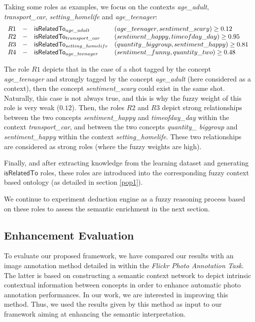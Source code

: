 		Taking some roles as examples, we focus on the contexts \emph{age\_adult}, \emph{transport\_car},
		\emph{setting\_homelife} and \emph{age\_teenager}:
		\begin{equation*}
			\begin{array}{ c c l l}
			R1 & - &\mathsf{isRelatedTo}_{age\_adult} 
				& (age\_teenager,sentiment\_scary) \geq 0.12\\
			R2 & - &\mathsf{isRelatedTo}_{transport\_car}
				& (sentiment\_happy,timeofday\_day) \geq 0.95\\
			R3 & - &\mathsf{isRelatedTo}_{setting\_homelife} 
				& (quantity\_biggroup,sentiment\_happy) \geq 0.81\\
			R4 & - &\mathsf{isRelatedTo}_{age\_teenager}
				& (sentiment\_funny,quantity\_two) \geq 0.48
			
			\end{array}
		\end{equation*}

		The role $R1$ depicts that in the case of a shot tagged by the concept \emph{age\_teenager} 
		and strongly tagged by the concept \emph{age\_adult} (here considered as a context), then the concept 
		\emph{sentiment\_scary} could exist in the same shot. Naturally, this case is not always true, 
		and this is why the fuzzy weight of this role is very weak ($0.12$).
		Then, the roles $R2$  and $R3$ depict strong relationships between the two concepts 
		\emph{sentiment\_happy} and \emph{timeofday\_day} within the context \emph{transport\_car},
		and between the two concepts \emph{quantity\_ biggroup} and \emph{sentiment\_happy} within 
		the context \emph{setting\_homelife}. These two relationships are considered as strong roles 
		(where the fuzzy weights are high).

		Finally, and after extracting knowledge from the learning dataset and generating $\mathsf{isRelatedTo}$
		roles, these roles are introduced into the corresponding fuzzy context based ontology (as detailed in section \ref{pop1}).
		
		We continue to experiment deduction engine as a fuzzy reasoning process based 
		on these roles to assess the semantic enrichment in the next section.

		\subsection{Enhancement Evaluation}
		To evaluate our proposed framework, we have compared our results with an image annotation 
		method detailed in \citep{Ksibi2012} within the \emph{Flickr Photo Annotation Task}. 
		The latter is based on constructing a semantic context network to depict intrinsic 
		contextual information between concepts in order to enhance automatic photo annotation performances.
		In our work, we are interested in improving this method. Thus, we used the results given by this 
		method as input to our framework aiming at enhancing the semantic interpretation.


